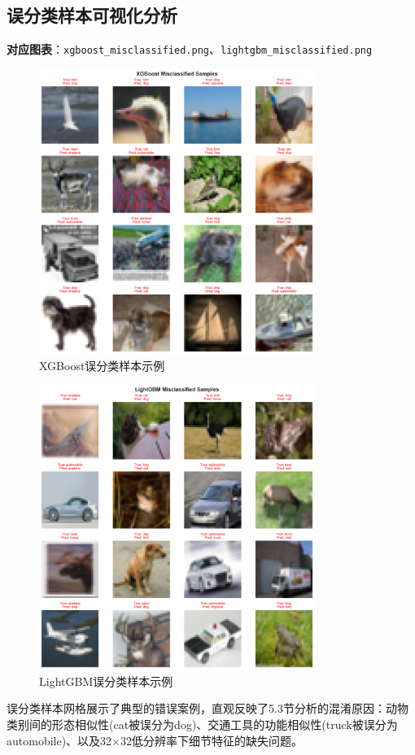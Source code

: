 \documentclass[UTF8]{report}
\theoremstyle{MyLineTheoremStyle} %
\theoremstyle{MyBlockTheoremStyle} %
\theoremstyle{MySubsubsectionStyle} %
\begin{document}
\subsection{误分类样本可视化分析}
\textbf{对应图表}：\texttt{xgboost\_misclassified.png}、\texttt{lightgbm\_misclassified.png}
\begin{figure}[H]
    \centering
    \includegraphics[width=0.8\textwidth]{xgboost_misclassified.png}
    \caption{XGBoost误分类样本示例}
\end{figure}
\begin{figure}[H]
    \centering
    \includegraphics[width=0.8\textwidth]{lightgbm_misclassified.png}
    \caption{LightGBM误分类样本示例}
\end{figure}
误分类样本网格展示了典型的错误案例，直观反映了5.3节分析的混淆原因：动物类别间的形态相似性(cat被误分为dog)、交通工具的功能相似性(truck被误分为automobile)、以及32×32低分辨率下细节特征的缺失问题。
\end{document}
